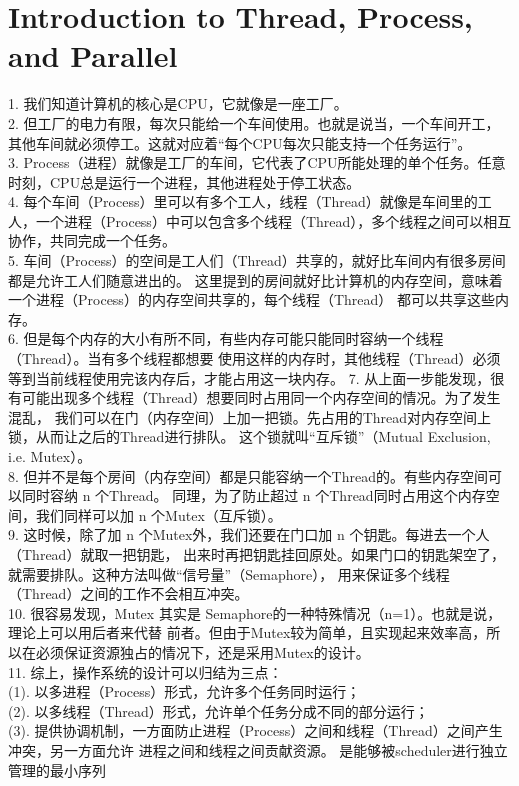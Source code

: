 \documentclass[12pt]{article}
\begin{document}
\section*{Introduction to Thread, Process, and Parallel}



{\small1. 我们知道计算机的核心是CPU，它就像是一座工厂。}\\
{\small2. 但工厂的电力有限，每次只能给一个车间使用。也就是说当，一个车间开工，其他车间就必须停工。这就对应着“每个CPU每次只能支持一个任务运行”。}\\
{\small3. Process（进程）就像是工厂的车间，它代表了CPU所能处理的单个任务。任意时刻，CPU总是运行一个进程，其他进程处于停工状态。}\\
{\small4. 每个车间（Process）里可以有多个工人，线程（Thread）就像是车间里的工人，一个进程（Process）中可以包含多个线程（Thread），多个线程之间可以相互协作，共同完成一个任务。}\\
{\small5. 车间（Process）的空间是工人们（Thread）共享的，就好比车间内有很多房间都是允许工人们随意进出的。
这里提到的房间就好比计算机的内存空间，意味着一个进程（Process）的内存空间共享的，每个线程（Thread）
都可以共享这些内存。}\\
{\small6. 但是每个内存的大小有所不同，有些内存可能只能同时容纳一个线程（Thread）。当有多个线程都想要
使用这样的内存时，其他线程（Thread）必须等到当前线程使用完该内存后，才能占用这一块内存。}
{\small7. 从上面一步能发现，很有可能出现多个线程（Thread）想要同时占用同一个内存空间的情况。为了发生混乱，
我们可以在门（内存空间）上加一把锁。先占用的Thread对内存空间上锁，从而让之后的Thread进行排队。
这个锁就叫“互斥锁”（Mutual Exclusion, i.e. Mutex）。}\\
{\small8. 但并不是每个房间（内存空间）都是只能容纳一个Thread的。有些内存空间可以同时容纳 n 个Thread。
同理，为了防止超过 n 个Thread同时占用这个内存空间，我们同样可以加 n 个Mutex（互斥锁）。}\\
{\small9. 这时候，除了加 n 个Mutex外，我们还要在门口加 n 个钥匙。每进去一个人（Thread）就取一把钥匙，
出来时再把钥匙挂回原处。如果门口的钥匙架空了，就需要排队。这种方法叫做“信号量”（Semaphore），
用来保证多个线程（Thread）之间的工作不会相互冲突。}\\
{\small10. 很容易发现，Mutex 其实是 Semaphore的一种特殊情况（n=1）。也就是说，理论上可以用后者来代替
前者。但由于Mutex较为简单，且实现起来效率高，所以在必须保证资源独占的情况下，还是采用Mutex的设计。}\\
{\small11. 综上，操作系统的设计可以归结为三点：\\
(1). 以多进程（Process）形式，允许多个任务同时运行；\\
(2). 以多线程（Thread）形式，允许单个任务分成不同的部分运行；\\
(3). 提供协调机制，一方面防止进程（Process）之间和线程（Thread）之间产生冲突，另一方面允许
    进程之间和线程之间贡献资源。
是能够被scheduler进行独立管理的最小序列}\\
\end{document}
